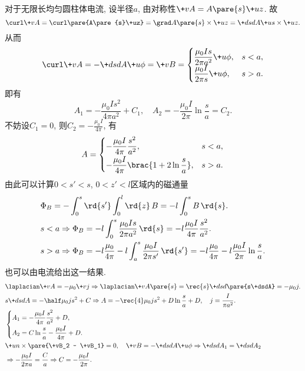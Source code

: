 \documentclass[hidelinks]{ctexart}
\begin{document}
\begin{sample}
    \begin{ex}
        对于无限长均匀圆柱体电流, 设半径$a$, 由对称性$\+vA = A\pare{s}\+uz$. 故
        \[ \curl \+vA = \curl\pare{A\pare{s}\+uz} = \grad A\pare{s}\times \+uz = \+dsdA \+us\times \+uz. \]
        从而
        \[ \curl \+vA = -\+dsdA\+u\phi = \+vB = \begin{cases}
            \displaystyle \frac{\mu_0 Is}{2\pi a^2}\+u\phi, & s<a, \\
            \displaystyle \frac{\mu_0 I}{2\pi s}\+u\phi, & s>a.
        \end{cases} \]
        即有
        \[ A_1 = -\frac{\mu_0 Is^2}{4\pi a^2} + C_1,\quad A_2 = -\frac{\mu_0 I}{2\pi}\ln \frac{s}{a} = C_2. \]
        不妨设$C_1 = 0$, 则$\displaystyle C_2 = -\frac{\mu_0I}{4\pi}$, 有
        \[ A = \begin{cases}
            \displaystyle -\frac{\mu_0 I}{4\pi}\frac{s^2}{a^2}, & s<a, \\[.5em]
            \displaystyle -\frac{\mu_0 I}{4\pi}\brac{1+2\ln\frac{s}{a}}, & s>a.
        \end{cases} \]
        由此可以计算$0<s'<s$, $0<z'<l$区域内的磁通量
        \begin{align*}
            & \Phi_B = -\int_0^s \rd{s'}\int_0^l \rd{z}\, B = -l\int_0^s B\,\rd{s}. \\
            & s<a \Rightarrow \Phi_B = -l \int_0^s \frac{\mu_0 Is}{2\pi a^2}\,\rd{s} = -l\frac{\mu_0 I}{4\pi}\frac{s^2}{a^2}. \\
            & s>a \Rightarrow \Phi_B = -l\frac{\mu_0}{4\pi} - l\int_a^s \frac{\mu_0 I}{2\pi s'}\,\rd{s'} = -l\frac{\mu_0}{4\pi} - l \frac{\mu_0 I}{2\pi} \ln \frac{s}{a}.
        \end{align*}
        也可以由电流给出这一结果.
        \begin{align*}
            & \laplacian \+vA = -\mu_0 \+vj \Rightarrow \laplacian \+vA\pare{s} = \rec{s}\+dsd{}\pare{s\+dsdA} = -\mu_0 j. \\
            & s\+dsdA = -\half \mu_0 js^2 + C \Rightarrow A = -\rec{4}\mu_0 js^2 + D \ln \frac{s}{a} + D,\quad j = \frac{I}{\pi a^2}. \\
            & \begin{cases}
                \displaystyle A_1 = -\frac{\mu_0 I}{4\pi}\frac{s^2}{a^2} + D, \\[.5em]
                \displaystyle A_2 = C\ln\frac{s}{a} - \frac{\mu_0 I}{4\pi} + D.
            \end{cases} \\
            & \+un\times\pare{\+vB_2 - \+vB_1} = 0, \quad \+vB = -\+dsdA\+u\phi \Rightarrow \+dsd{A_1} = \+dsd{A_2} \\
            & \Rightarrow -\frac{\mu_0 I}{2\pi a} = \frac{C}{a} \Rightarrow C = -\frac{\mu_0 I}{2\pi}.
        \end{align*}
    \end{ex}
\end{sample}
\end{document}
